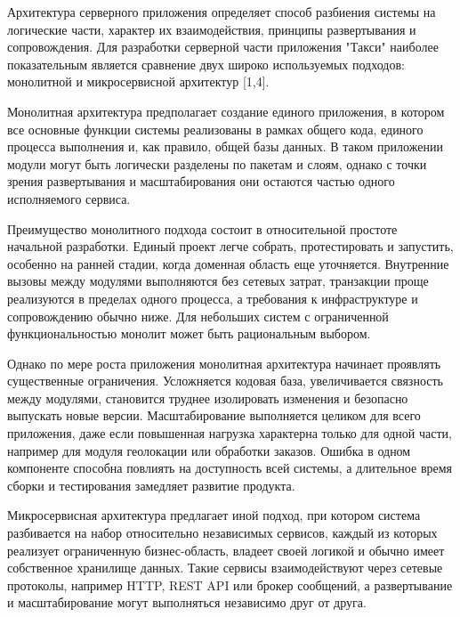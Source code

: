 \subtitlespace

{\gostFont
	
	\par \redline Архитектура серверного приложения определяет способ разбиения системы на логические части, характер их взаимодействия, принципы развертывания и сопровождения. Для разработки серверной части приложения "Такси"{} наиболее показательным является сравнение двух широко используемых подходов: монолитной и микросервисной архитектур [1,4].
	
	\par \redline Монолитная архитектура предполагает создание единого приложения, в котором все основные функции системы реализованы в рамках общего кода, единого процесса выполнения и, как правило, общей базы данных. В таком приложении модули могут быть логически разделены по пакетам и слоям, однако с точки зрения развертывания и масштабирования они остаются частью одного исполняемого сервиса.
	
	\par \redline Преимущество монолитного подхода состоит в относительной простоте начальной разработки. Единый проект легче собрать, протестировать и запустить, особенно на ранней стадии, когда доменная область еще уточняется. Внутренние вызовы между модулями выполняются без сетевых затрат, транзакции проще реализуются в пределах одного процесса, а требования к инфраструктуре и сопровождению обычно ниже. Для небольших систем с ограниченной функциональностью монолит может быть рациональным выбором.
	
	\par \redline Однако по мере роста приложения монолитная архитектура начинает проявлять существенные ограничения. Усложняется кодовая база, увеличивается связность между модулями, становится труднее изолировать изменения и безопасно выпускать новые версии. Масштабирование выполняется целиком для всего приложения, даже если повышенная нагрузка характерна только для одной части, например для модуля геолокации или обработки заказов. Ошибка в одном компоненте способна повлиять на доступность всей системы, а длительное время сборки и тестирования замедляет развитие продукта.
	
\par \redline Микросервисная архитектура предлагает иной подход, при котором система разбивается на набор относительно независимых сервисов, каждый из которых реализует ограниченную бизнес-область, владеет своей логикой и обычно имеет собственное хранилище данных. Такие сервисы взаимодействуют через сетевые протоколы, например HTTP, REST API или брокер сообщений, а развертывание и масштабирование могут выполняться независимо друг от друга.

}
